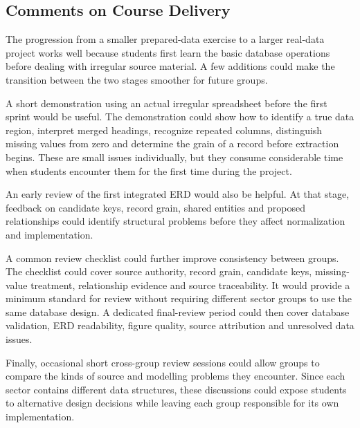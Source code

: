 \subsection{Comments on Course Delivery}
\label{subsec:course-comments}

The progression from a smaller prepared-data exercise to a larger real-data
project works well because students first learn the basic database operations
before dealing with irregular source material. A few additions could make the
transition between the two stages smoother for future groups.

A short demonstration using an actual irregular spreadsheet before the first
sprint would be useful. The demonstration could show how to identify a true
data region, interpret merged headings, recognize repeated columns,
distinguish missing values from zero and determine the grain of a record before
extraction begins. These are small issues individually, but they consume
considerable time when students encounter them for the first time during the
project.

An early review of the first integrated ERD would also be helpful. At that
stage, feedback on candidate keys, record grain, shared entities and proposed
relationships could identify structural problems before they affect
normalization and implementation.

A common review checklist could further improve consistency between groups.
The checklist could cover source authority, record grain, candidate keys,
missing-value treatment, relationship evidence and source traceability. It
would provide a minimum standard for review without requiring different sector
groups to use the same database design. A dedicated final-review period could
then cover database validation, ERD readability, figure quality, source
attribution and unresolved data issues.

Finally, occasional short cross-group review sessions could allow groups to
compare the kinds of source and modelling problems they encounter. Since each
sector contains different data structures, these discussions could expose
students to alternative design decisions while leaving each group responsible
for its own implementation.
